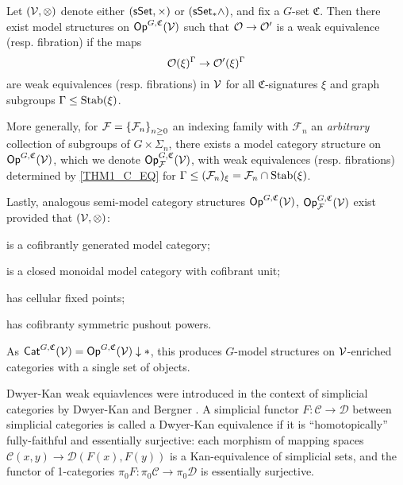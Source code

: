 \documentclass[a4paper,10pt
,draft
]{article}%
\renewcommand{\F}{\mathcal F}
\renewcommand{\1}{\eta}%
\begin{document}
\begin{theorem}
      \label{THM1_C}
      Let $(\mathcal V,\otimes)$ denote either $(\mathsf{sSet}, \times)$ or $(\sSet_{\**} \wedge)$,
      and fix a $G$-set $\mathfrak C$.
      Then there exist model structures on $\mathsf{Op}^{G, \mathfrak C}(\mathcal V)$ such that
      $\mathcal{O} \to \mathcal{O}'$ is a weak equivalence (resp. fibration) if the maps
      \begin{equation}
            \label{THM1_C_EQ}
            \mathcal{O}(\xi)^\Gamma \to \mathcal{O}'(\xi)^\Gamma
      \end{equation}
      are weak equivalences (resp. fibrations) in $\mathcal V$ for all
      $\mathfrak C$-signatures $\xi$ and
      graph subgroups $\Gamma \leq \mathrm{Stab}(\xi)$.

      More generally, for $\F = \set{\F_n}_{n \geq 0}$ an indexing family with $\F_n$ an \textit{arbitrary} collection of subgroups of $G \times \Sigma_n$,
      there exists a model category structure on $\mathsf{Op}^{G, \mathfrak C}(\mathcal V)$, which we denote $\Op^{G, \mathfrak C}_\F(\V)$,
      with weak equivalences (resp. fibrations) determined by \eqref{THM1_C_EQ} for $\Gamma \leq (\F_n)_\ksi = \F_n \cap \Stab(\ksi)$.

      Lastly, analogous semi-model category structures $\mathsf{Op}^{G, \mathfrak C}(\mathcal V)$, $\Op^{G, \mathfrak C}_\F(\V)$ exist provided that
      $(\mathcal V, \otimes)$:
      \begin{enumerate*}[label = (\roman*)]
      \item is a cofibrantly generated model category;
      \item is a closed monoidal model category with cofibrant unit;
      \item has cellular fixed points;
      \item has cofibranty symmetric pushout powers.
      \end{enumerate*}
\end{theorem}

\begin{remark}
      As $\Cat^{G, \mathfrak C}(\V) = \Op^{G, \mathfrak C}(\V) \downarrow \**$,
      this produces $G$-model structures on $\mathcal V$-enriched categories with a single set of objects.
\end{remark}




Dwyer-Kan weak equiavlences were introduced in the context of simplicial categories by Dwyer-Kan and Bergner \cite{DK80, Ber07b}.
A simplicial functor $F: \mathcal C \to \mathcal D$ between simplicial categories is called a Dwyer-Kan equivalence if
it is ``homotopically'' fully-faithful and essentially surjective:
each morphism of mapping spaces $\mathcal C(x, y) \to \mathcal D(F(x), F(y))$ is a Kan-equivalence of simplicial sets, and
the functor of 1-categories $\pi_0F: \pi_0\mathcal C \to \pi_0 \mathcal D$ is essentially surjective.
\end{document}
